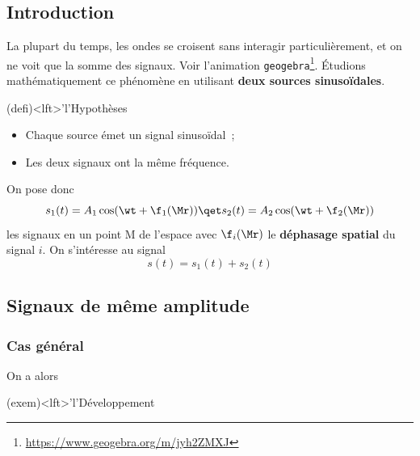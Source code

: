 \documentclass[../../main/main.tex]{subfiles}
\begin{document}
\subsection{Introduction}

La plupart du temps, les ondes se croisent sans interagir particulièrement, et
on ne voit que la somme des signaux. Voir l'animation
\texttt{geogebra}\footnote{\url{https://www.geogebra.org/m/jyh2ZMXJ}}. Étudions
mathématiquement ce phénomène en utilisant \textbf{deux sources sinusoïdales}.

\begin{tcb}(defi)<lft>'l'{Hypothèses}
	\begin{itemize}
		\item Chaque source émet un signal sinusoïdal~;
		\item Les deux signaux ont la même fréquence.
	\end{itemize}
\end{tcb}
\noindent
On pose donc
\[
	s_1(t) = A_1\cos(\wt+\f_1(\Mr))
	\qet
	s_2(t) = A_2\cos(\wt+\f_2(\Mr))
\]
les signaux en un point M de l'espace avec $\f_i(\Mr)$ le \textbf{déphasage
	spatial} du signal $i$. On s'intéresse au signal
\[s(t) = s_1(t) + s_2(t)\]

\subsection{Signaux de même amplitude}
\subsubsection{Cas général}


On a alors
\begin{tcb}(exem)<lft>'l'{\small Développement}
	\vspace{-24pt}
	\vspace{-24pt}
\end{tcb}
\end{document}
